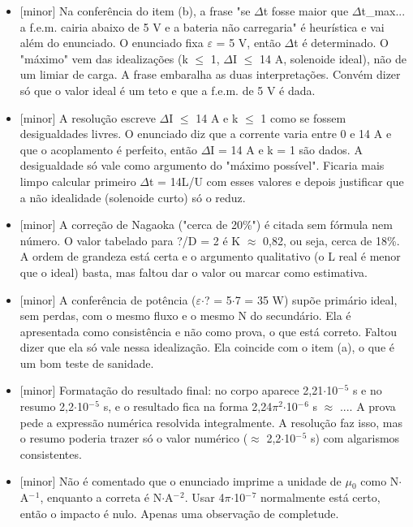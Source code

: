 \documentclass{article}%
\begin{document}
\begin{itemize}%
\item%
{[}minor{]} Na conferência do item (b), a frase "se $\Delta$t fosse maior que $\Delta$t\_max... a f.e.m. cairia abaixo de 5 V e a bateria não carregaria" é heurística e vai além do enunciado. O enunciado fixa $\varepsilon$ = 5 V, então $\Delta$t é determinado. O "máximo" vem das idealizações (k $\leq$ 1, $\Delta$I $\leq$ 14 A, solenoide ideal), não de um limiar de carga. A frase embaralha as duas interpretações. Convém dizer só que o valor ideal é um teto e que a f.e.m. de 5 V é dada.%
\item%
{[}minor{]} A resolução escreve $\Delta$I $\leq$ 14 A e k $\leq$ 1 como se fossem desigualdades livres. O enunciado diz que a corrente varia entre 0 e 14 A e que o acoplamento é perfeito, então $\Delta$I = 14 A e k = 1 são dados. A desigualdade só vale como argumento do "máximo possível". Ficaria mais limpo calcular primeiro $\Delta$t = 14L/U com esses valores e depois justificar que a não idealidade (solenoide curto) só o reduz.%
\item%
{[}minor{]} A correção de Nagaoka ("cerca de 20\%") é citada sem fórmula nem número. O valor tabelado para ?/D = 2 é K $\approx$ 0,82, ou seja, cerca de 18\%. A ordem de grandeza está certa e o argumento qualitativo (o L real é menor que o ideal) basta, mas faltou dar o valor ou marcar como estimativa.%
\item%
{[}minor{]} A conferência de potência ($\varepsilon$$\cdot$? = 5$\cdot$7 = 35 W) supõe primário ideal, sem perdas, com o mesmo fluxo e o mesmo N do secundário. Ela é apresentada como consistência e não como prova, o que está correto. Faltou dizer que ela só vale nessa idealização. Ela coincide com o item (a), o que é um bom teste de sanidade.%
\item%
{[}minor{]} Formatação do resultado final: no corpo aparece 2,21$\cdot$10$^{-}$$^{5}$ s e no resumo 2,2$\cdot$10$^{-}$$^{5}$ s, e o resultado fica na forma 2,24$\pi$$^2$$\cdot$10$^{-}$$^{6}$ s $\approx$ .... A prova pede a expressão numérica resolvida integralmente. A resolução faz isso, mas o resumo poderia trazer só o valor numérico ($\approx$ 2,2$\cdot$10$^{-}$$^{5}$ s) com algarismos consistentes.%
\item%
{[}minor{]} Não é comentado que o enunciado imprime a unidade de $\mu$$_{0}$ como N$\cdot$A$^{-}$$^{1}$, enquanto a correta é N$\cdot$A$^{-}$$^2$. Usar 4$\pi$$\cdot$10$^{-}$$^{7}$ normalmente está certo, então o impacto é nulo. Apenas uma observação de completude.%
\end{itemize}%
\end{document}
